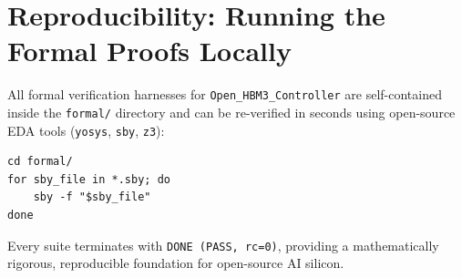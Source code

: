 \documentclass[journal,10pt,twocolumn]{IEEEtran}
\begin{document}
\section{Reproducibility: Running the Formal Proofs Locally}

All formal verification harnesses for \texttt{Open\_HBM3\_Controller} are self-contained inside the \texttt{formal/} directory and can be re-verified in seconds using open-source EDA tools (\texttt{yosys}, \texttt{sby}, \texttt{z3}):

\begin{footnotesize}\begin{verbatim}
cd formal/
for sby_file in *.sby; do
    sby -f "$sby_file"
done
\end{verbatim}\end{footnotesize}

Every suite terminates with \texttt{DONE (PASS, rc=0)}, providing a mathematically rigorous, reproducible foundation for open-source AI silicon.
\end{document}
